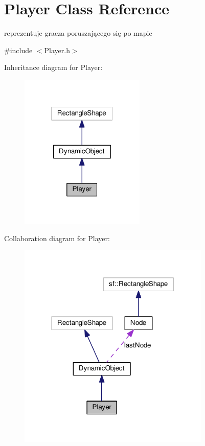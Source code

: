\hypertarget{classPlayer}{}\section{Player Class Reference}
\label{classPlayer}


reprezentuje gracza poruszającego się po mapie  




{\ttfamily \#include $<$Player.\+h$>$}



Inheritance diagram for Player\+:\nopagebreak
\begin{figure}[H]
\begin{center}
\leavevmode
\includegraphics[width=169pt]{classPlayer__inherit__graph}
\end{center}
\end{figure}


Collaboration diagram for Player\+:\nopagebreak
\begin{figure}[H]
\begin{center}
\leavevmode
\includegraphics[width=259pt]{classPlayer__coll__graph}
\end{center}
\end{figure}
